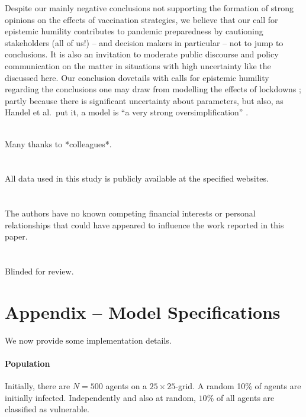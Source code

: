 \documentclass[a4paper,12pt]{article}
\begin{document}
Despite our mainly negative conclusions not supporting the formation of strong opinions on the effects of vaccination strategies, we believe that our call for epistemic humility contributes to pandemic preparedness by cautioning stakeholders (all of us!) -- and decision makers in particular -- not to jump to conclusions. It is also an invitation to moderate public discourse and policy communication on the matter in situations with high uncertainty like the discussed here. Our conclusion dovetails with calls for epistemic humility regarding the conclusions one may draw from modelling the effects of lockdowns \cite[Chapter~3]{Winsberg2024}; partly because there is significant uncertainty about parameters, but also, as Handel et al.\ put it, a model is ``a very strong oversimplification'' \cite[P.\ 835]{Handel2007}.

\theendnotes

\\
Many thanks to *colleagues*.\\%
\\
\\
All data used in this study is publicly available at the specified websites.\\
\\
\\
The authors have no known competing financial interests or personal relationships that could have appeared to influence the work reported in this paper.\\
\\
\\
Blinded for review. %

\printbibliography
%


\newpage
\section*{Appendix -- Model Specifications}
We now provide some implementation details.

\paragraph{Population} Initially, there are $N=500$ agents on a $25\times25$-grid. A random 10\% of agents are initially infected. Independently and also at random, $10\%$ of all agents are classified as vulnerable.
\end{document}
